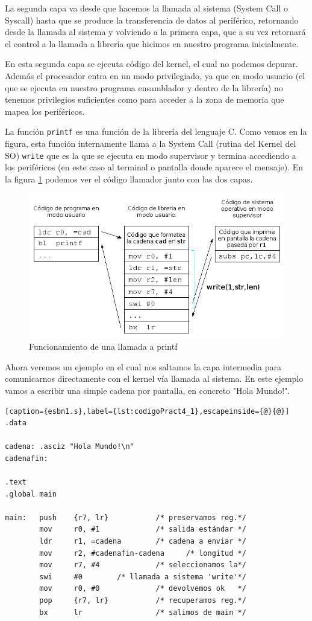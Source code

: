 La segunda capa va desde que hacemos la llamada al sistema (System Call o Syscall) hasta que se
produce la transferencia de datos al periférico, retornando desde la llamada
al sistema y volviendo a la primera capa, que a su vez retornará el control
a la llamada a librería que hicimos en nuestro programa inicialmente.

En esta segunda capa se ejecuta código del kernel, el cual no podemos depurar.
Además el procesador entra en un modo privilegiado, ya que en modo usuario (el
que se ejecuta en nuestro programa ensamblador y dentro de la librería) no
tenemos privilegios suficientes como para acceder a la zona de memoria que
mapea los periféricos.

La función {\tt printf} es una función de la librería del lenguaje C. Como vemos en
la figura, esta función internamente llama a la System Call (rutina del Kernel del SO)
{\tt write} que es la que se ejecuta en modo supervisor y termina accediendo a
los periféricos (en este caso al terminal o pantalla donde aparece el mensaje). En la
figura \ref{fig:capas} podemos ver el código llamador junto con las dos capas.

\begin{figure}[h]
  \centering
    \includegraphics[width=14cm]{graphs/capas.png}
  \caption{Funcionamiento de una llamada a printf}
  \label{fig:capas}
\end{figure}

Ahora veremos un ejemplo en el cual nos saltamos la capa intermedia para
comunicarnos directamente con el kernel vía llamada al sistema. En este ejemplo
vamos a escribir una simple cadena por pantalla, en concreto "Hola Mundo!".

\begin{lstlisting}[caption={esbn1.s},label={lst:codigoPract4_1},escapeinside={@}{@}]
.data

cadena: .asciz "Hola Mundo!\n"
cadenafin:

.text
.global main
 
main:   push    {r7, lr}           /* preservamos reg.*/
        mov     r0, #1             /* salida estándar */
        ldr     r1, =cadena        /* cadena a enviar */
        mov     r2, #cadenafin-cadena     /* longitud */
        mov     r7, #4             /* seleccionamos la*/
        swi     #0        /* llamada a sistema 'write'*/
        mov     r0, #0             /* devolvemos ok   */
        pop     {r7, lr}           /* recuperamos reg.*/
        bx      lr                 /* salimos de main */
\end{lstlisting}

